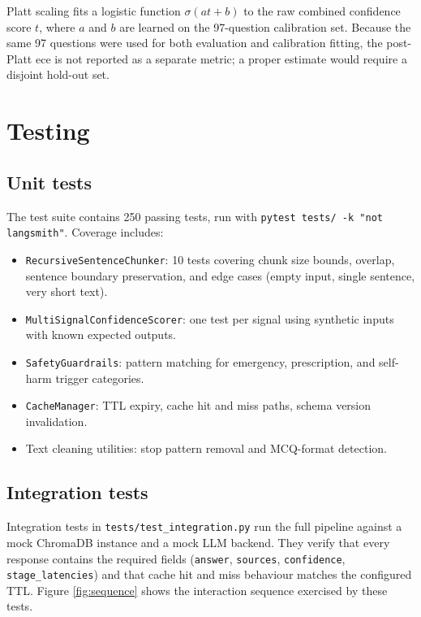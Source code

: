 Platt scaling fits a logistic function $\sigma(at + b)$ to the raw combined confidence score $t$, where $a$ and $b$ are learned on the 97-question calibration set. Because the same 97 questions were used for both evaluation and calibration fitting, the post-Platt \ac{ece} is not reported as a separate metric; a proper estimate would require a disjoint hold-out set.

\section{Testing}

\subsection{Unit tests}

The test suite contains 250 passing tests, run with \texttt{pytest tests/ -k "not langsmith"}. Coverage includes:

\begin{itemize}
    \item \texttt{RecursiveSentenceChunker}: 10 tests covering chunk size bounds, overlap, sentence boundary preservation, and edge cases (empty input, single sentence, very short text).
    \item \texttt{MultiSignalConfidenceScorer}: one test per signal using synthetic inputs with known expected outputs.
    \item \texttt{SafetyGuardrails}: pattern matching for emergency, prescription, and self-harm trigger categories.
    \item \texttt{CacheManager}: TTL expiry, cache hit and miss paths, schema version invalidation.
    \item Text cleaning utilities: stop pattern removal and MCQ-format detection.
\end{itemize}

\subsection{Integration tests}

Integration tests in \texttt{tests/test\_integration.py} run the full pipeline against a mock ChromaDB instance and a mock LLM backend. They verify that every response contains the required fields (\texttt{answer}, \texttt{sources}, \texttt{confidence}, \texttt{stage\_latencies}) and that cache hit and miss behaviour matches the configured TTL. Figure \ref{fig:sequence} shows the interaction sequence exercised by these tests.

